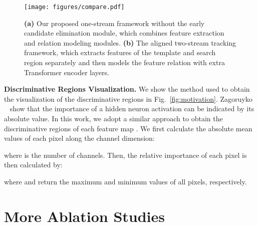 \begin{figure}[t]
\centering
\setlength{\abovecaptionskip}{0.05cm}
\texttt{[image: figures/compare.pdf]}
\caption{\textbf{(a)} Our proposed one-stream framework without the early candidate elimination module, which combines feature extraction and relation modeling modules. \textbf{(b)} The aligned  two-stream tracking framework, which extracts features of the template and search region separately and then models the feature relation with extra Transformer encoder layers.}
\label{fig:arch_comapre}
\end{figure}

\textbf{Discriminative Regions Visualization.}
We show the method used to obtain the visualization of the discriminative regions in Fig.~\ref{fig:motivation}. Zagoruyko \etal~\cite{zagoruyko2017paying} show that the importance of a hidden neuron activation can be indicated by its absolute value. In this work, we adopt a similar approach to obtain the discriminative regions of each feature map . We first calculate the absolute mean values of each pixel along the channel dimension: 


where  is the number of channels. Then, the relative importance of each pixel is then calculated by:


where  and  return the maximum and minimum values of all pixels, respectively.

\section{More Ablation Studies}

